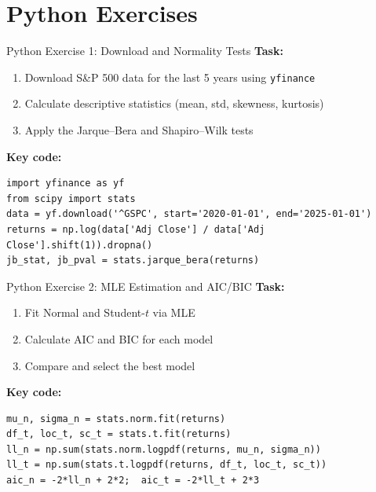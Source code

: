 \documentclass[9pt, aspectratio=169, t]{beamer}
\begin{document}
\section{Python Exercises}

\begin{frame}[fragile]{Python Exercise 1: Download and Normality Tests}
    \textbf{Task:}
    \begin{enumerate}\setlength{\itemsep}{0pt}
        \item Download S\&P 500 data for the last 5 years using \texttt{yfinance}
        \item Calculate descriptive statistics (mean, std, skewness, kurtosis)
        \item Apply the Jarque--Bera and Shapiro--Wilk tests
    \end{enumerate}

    \vspace{0.3cm}
    \textbf{Key code:}
    \begin{verbatim}
import yfinance as yf
from scipy import stats
data = yf.download('^GSPC', start='2020-01-01', end='2025-01-01')
returns = np.log(data['Adj Close'] / data['Adj Close'].shift(1)).dropna()
jb_stat, jb_pval = stats.jarque_bera(returns)
    \end{verbatim}

\end{frame}

\begin{frame}[fragile]{Python Exercise 2: MLE Estimation and AIC/BIC}
    \textbf{Task:}
    \begin{enumerate}\setlength{\itemsep}{0pt}
        \item Fit Normal and Student-$t$ via MLE
        \item Calculate AIC and BIC for each model
        \item Compare and select the best model
    \end{enumerate}

    \vspace{0.3cm}
    \textbf{Key code:}
    \begin{verbatim}
mu_n, sigma_n = stats.norm.fit(returns)
df_t, loc_t, sc_t = stats.t.fit(returns)
ll_n = np.sum(stats.norm.logpdf(returns, mu_n, sigma_n))
ll_t = np.sum(stats.t.logpdf(returns, df_t, loc_t, sc_t))
aic_n = -2*ll_n + 2*2;  aic_t = -2*ll_t + 2*3
    \end{verbatim}

\end{frame}
\end{document}
